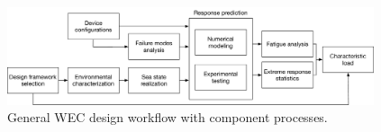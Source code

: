 \begin{figure}[H]
	\centering
	\includegraphics[width=0.96\textwidth]{./Figures/WecDesignWorkflow.pdf}
	\caption{General WEC design workflow with component processes.}
	\label{fig:WecDesignWorkflow}
\end{figure}




